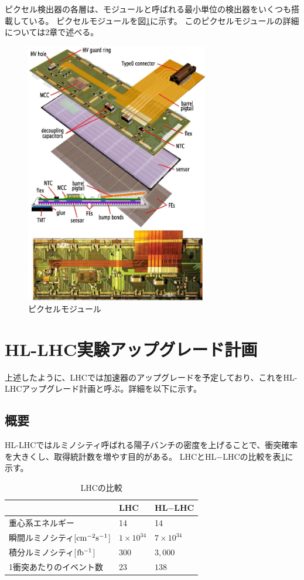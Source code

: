 ピクセル検出器の各層は、モジュールと呼ばれる最小単位の検出器をいくつも搭載している。
ピクセルモジュールを図\ref{pixel_detector}に示す。
このピクセルモジュールの詳細については2章で述べる。
\begin{figure}[bpt]\centering
\includegraphics[width=8cm]{pixel_detector}
\caption[ピクセルモジュール]{ピクセルモジュール\cite{1-2}}
\label{pixel_detector}
\end{figure}


\clearpage
\section{HL-LHC実験アップグレード計画}
上述したように、LHCでは加速器のアップグレードを予定しており、これをHL-LHCアップグレード計画と呼ぶ。詳細を以下に示す。
\subsection{概要}
HL-LHCではルミノシティ呼ばれる陽子バンチの密度を上げることで、衝突確率を大きくし、取得統計数を増やす目的がある。
LHCとHL$-$LHCの比較を表\ref{compare_lhc}に示す。

\begin{table}[tbp]
\begin{center}
\caption[LHCの比較]{LHCの比較\cite{1-6}}
\label{compare_lhc}
  \begin{tabular}{|lll|} \hline
    & LHC & HL$-$LHC \\ \hline
    重心系エネルギー & 14 & 14 \\
    瞬間ルミノシティ[$\rm{cm^{-2}s^{-1}}$] & $1\times 10^{34}$ & $7\times10^{34}$ \\
    積分ルミノシティ[$\rm{fb^{-1}}$] & $300$ & $3,000$ \\
    1衝突あたりのイベント数 & $23$ & $138$ \\ \hline 
  \end{tabular}
\end{center}
\end{table}

